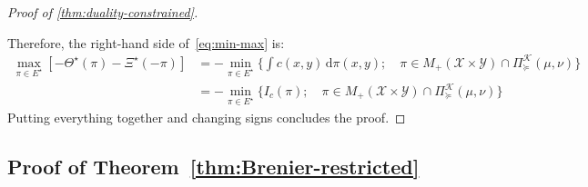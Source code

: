 \documentclass[10pt]{article}
\newcommand{\ud}{\,\mathrm{d}}
\newcommand{\calK}{\mathcal{K}}
\newcommand{\calX}{\mathcal{X}}
\newcommand{\calY}{\mathcal{Y}}
\numberwithin{equation}{section}
\begin{document}
\begin{proof}[Proof of \autoref{thm:duality-constrained}]
\begin{enumerate}
	\end{enumerate} 
	Therefore, the right-hand side of~\eqref{eq:min-max} is:
	\begin{align*}
	\max_{\pi \in E^\star}\left[-\Theta^\star(\pi)-\Xi^\star(-\pi)\right] 
	&= - \min_{\pi\in E^\star}\{\int c(x,y)\ud \pi(x,y);\quad \pi \in M_+(\calX \times \calY)\cap \Pi_\succeq^\calK(\mu,\nu) \}\\
	&= - \min_{\pi\in E^\star}\{I_c(\pi);\quad \pi \in M_+(\calX \times \calY)\cap \Pi_\succeq^\calK(\mu,\nu) \}
	\end{align*}
	Putting everything together and changing signs concludes the proof.
\end{proof}	
\subsection{Proof of Theorem~\ref{thm:Brenier-restricted}}\label{apdx:proof-Brenier-restricted}
\end{document}
